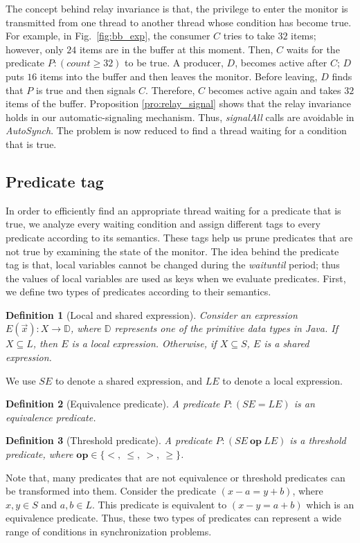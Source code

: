 \documentclass[preprint]{sigplanconf}
\newtheorem{definition}{Definition}
\begin{document}
The concept behind relay invariance is that, the privilege to enter the monitor
is transmitted from one thread to another thread whose condition has become true. 
For example, in Fig.~\ref{fig:bb_exp}, the consumer $C$ tries to take
$32$ items; however, only $24$ items are in the buffer at this moment. Then, $C$
waits for the predicate $P:  (count \ge 32)$ to be true. A producer, $D$, becomes 
active after 
$C$; $D$ puts $16$ items into the buffer and then leaves the monitor. Before 
leaving, $D$ finds that $P$ is true and then signals $C$. Therefore, $C$ 
becomes active again and takes $32$ items of the buffer.
Proposition \ref{pro:relay_signal} shows that the relay
invariance holds in our automatic-signaling mechanism. 
Thus, {\em signalAll} calls are avoidable in {\em AutoSynch}. 
The problem is now reduced to find a thread waiting for a condition that is 
true. 

\subsection{Predicate tag} \label{sec:tag}
In order to efficiently find an appropriate thread waiting for a predicate that is
true, we analyze every waiting condition and assign different tags 
to every predicate according to its semantics. These  tags
help us prune predicates that are not true by examining the state 
of the monitor. The idea behind the predicate tag is that, local variables cannot be
changed during the {\em waituntil} period; thus the values of local variables are
used as keys when we evaluate predicates. 
First, we define two types of 
predicates according to their semantics. 
\begin{definition}[Local and shared expression]
    Consider an expression $E(\vec{x}): X \rightarrow \mathbb{D}$, where
    $\mathbb{D}$ represents one of the primitive data types in Java. If $X
    \subseteq L$, then $E$ is a local expression. Otherwise, 
    if $X \subseteq S$, $E$ is a shared expression.  
\end{definition}
We use $SE$ to denote a shared expression, and $LE$ to denote a local 
expression.

\begin{definition}[Equivalence predicate]
    A predicate $P: (SE = LE)$ is an equivalence predicate.
\end{definition}
\begin{definition}[Threshold predicate]
   A predicate $P: (SE\ \boldsymbol{op}\ LE)$ is a threshold predicate, where 
   $\boldsymbol{op}
    \in \{<,\ \le,\ >,\ \ge\}$.
    \end{definition}
Note that, many predicates that are not equivalence or threshold predicates can 
be transformed into them. Consider the predicate $(x - a = y + b)$, where 
$x, y \in S$ and $a,b \in L$. This predicate is equivalent to 
$(x - y = a + b)$ which is an equivalence predicate. Thus, these two types of 
predicates can represent a wide range of conditions in synchronization problems. 
\end{document}
